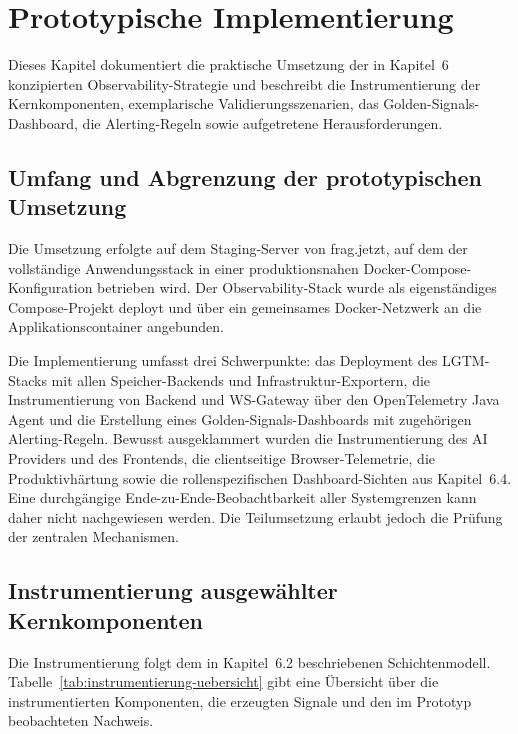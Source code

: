 
\chapter{Prototypische Implementierung}

Dieses Kapitel dokumentiert die praktische Umsetzung der in Kapitel~6 konzipierten Observability-Strategie und beschreibt die Instrumentierung der Kernkomponenten, exemplarische Validierungsszenarien, das Golden-Signals-Dashboard, die Alerting-Regeln sowie aufgetretene Herausforderungen.


\section{Umfang und Abgrenzung der prototypischen Umsetzung}

Die Umsetzung erfolgte auf dem Staging-Server von frag.jetzt, auf dem der vollständige Anwendungsstack in einer produktionsnahen Docker-Compose-Konfiguration betrieben wird. Der Observability-Stack wurde als eigenständiges Compose-Projekt deployt und über ein gemeinsames Docker-Netzwerk an die Applikationscontainer angebunden.

Die Implementierung umfasst drei Schwerpunkte: das Deployment des LGTM-Stacks mit allen Speicher-Backends und Infrastruktur-Exportern, die Instrumentierung von Backend und WS-Gateway über den OpenTelemetry Java Agent und die Erstellung eines Golden-Signals-Dashboards mit zugehörigen Alerting-Regeln. Bewusst ausgeklammert wurden die Instrumentierung des AI Providers und des Frontends, die clientseitige Browser-Telemetrie, die Produktivhärtung sowie die rollenspezifischen Dashboard-Sichten aus Kapitel~6.4. Eine durchgängige Ende-zu-Ende-Beobachtbarkeit aller Systemgrenzen kann daher nicht nachgewiesen werden. Die Teilumsetzung erlaubt jedoch die Prüfung der zentralen Mechanismen.


\section{Instrumentierung ausgewählter Kernkomponenten}
\label{sec:instrumentierung}

Die Instrumentierung folgt dem in Kapitel~6.2 beschriebenen Schichtenmodell. Tabelle~\ref{tab:instrumentierung-uebersicht} gibt eine Übersicht über die instrumentierten Komponenten, die erzeugten Signale und den im Prototyp beobachteten Nachweis.

